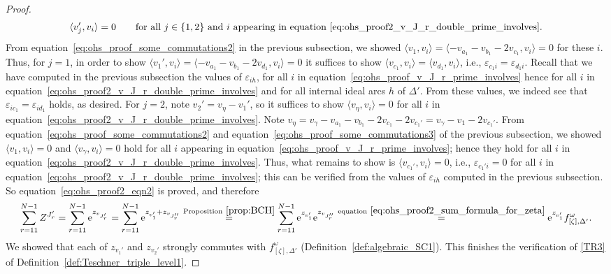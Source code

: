 \documentclass[pdftex]{sigma}
\numberwithin{equation}{section}
\theoremstyle{definition}
\begin{document}
\begin{proof}
\begin{align*}
\langle v_j', v_i\rangle=0 \qquad \mbox{for all $j\in \{1,2\}$ and $i$ appearing in equation~\eqref{eq:ohs_proof2_v_J_r_double_prime_involves}}.
\end{align*}
From equation~\eqref{eq:ohs_proof_some_commutations2} in the previous subsection, we showed $\langle v_1, v_i \rangle = \langle - v_{a_1} - v_{b_1} - 2v_{c_1}, v_i\rangle =0$ for these $i$. Thus, for $j=1$, in order to show $\langle v_1', v_i \rangle = \langle - v_{a_1} - v_{b_1} - 2v_{d_1}, v_i \rangle =0$ it suffices to show $\langle v_{c_1}, v_i \rangle = \langle v_{d_1}, v_i\rangle$, i.e., $\varepsilon_{c_1 i} = \varepsilon_{d_1 i}$. Recall that we have computed in the previous subsection the values of $\varepsilon_{ih}$, for all $i$ in equation~\eqref{eq:ohs_proof_v_J_r_prime_involves} hence for all $i$ in equation~\eqref{eq:ohs_proof2_v_J_r_double_prime_involves} and for all internal ideal arcs $h$ of $\Delta'$. From these values, we indeed see that $\varepsilon_{i c_1} = \varepsilon_{i d_1}$ holds, as desired. For $j=2$, note $v_2' = v_\eta - v_1'$, so it suffices to show $\langle v_\eta, v_i \rangle=0$ for all $i$ in equation~\eqref{eq:ohs_proof2_v_J_r_double_prime_involves}. Note $v_\eta = v_\gamma - v_{a_1} - v_{b_1} - 2v_{c_1} - 2v_{c_1'} = v_\gamma - v_1 - 2v_{c_1'}$. From equation~\eqref{eq:ohs_proof_some_commutations2} and equation~\eqref{eq:ohs_proof_some_commutations3} of the previous subsection, we showed $\langle v_1, v_i \rangle=0$ and $\langle v_\gamma, v_i \rangle=0$ hold for all $i$ appearing in equation~\eqref{eq:ohs_proof_v_J_r_prime_involves}; hence they hold for all $i$ in equation~\eqref{eq:ohs_proof2_v_J_r_double_prime_involves}. Thus, what remains to show is $\langle v_{c_1'}, v_i \rangle =0$, i.e., $\varepsilon_{c_1' i}=0$ for all $i$ in equation~\eqref{eq:ohs_proof2_v_J_r_double_prime_involves}; this can be verified from the values of $\varepsilon_{ih}$ computed in the previous subsection. So equation~\eqref{eq:ohs_proof2_eqn2} is proved, and therefore
\begin{align*}
\sum_{r=11}^{N-1} Z^{J_r'} = \sum_{r=11}^{N-1} {\rm e}^{z_{v_{J_r'}}}
= \sum_{r=11}^{N-1} {\rm e}^{z_{v_1'} + z_{v_{J_r''}}}
 \stackrel{{\rm Proposition}~\ref{prop:BCH}}{=}
\sum_{r=11}^{N-1} {\rm e}^{z_{v_1'}} {\rm e}^{z_{v_{J_r''}}}
 \stackrel{{\rm equation}~\eqref{eq:ohs_proof2_sum_formula_for_zeta}}{=}
{\rm e}^{z_{v_1'}} f^\omega_{[\zeta],\Delta'}.
\end{align*}
We showed that each of $z_{v_1'}$ and $z_{v_2'}$ strongly commutes with $f^\omega_{[\zeta],\Delta'}$ (Definition~\ref{def:algebraic_SC1}). This finishes the verification of \ref{TR3} of Definition~\ref{def:Teschner_triple_level1}.

\end{proof}
\end{document}
